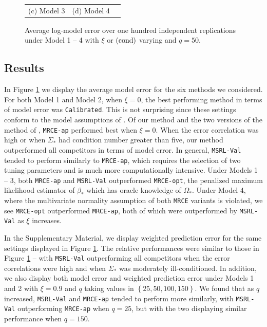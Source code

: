 \documentclass[12pt]{article}
\begin{document}
\begin{figure}[h!]
\begin{tabular}{ccc}
(c) Model 3  & (d) Model 4 & \\[6pt]
\end{tabular}
\caption{Average log-model error over one hundred independent replications under Model 1 -- 4 with $\xi$ or $(\rm cond)$ varying and $q=50$.}\label{fig:rho_Results}
\end{figure}

\subsection{Results}\label{subsec:Results}
In Figure \ref{fig:rho_Results} we display the average model error for the six methods we considered. For both Model 1 and Model 2, when $\xi = 0$, the best performing method in terms of model error was \texttt{Calibrated}. This is not surprising since these settings conform to the model assumptions of \citet{liu2015calibrated}. Of our method and the two versions of the method of \citet{rothman2010sparse}, \texttt{MRCE-ap} performed best when $\xi=0$. When the error correlation was high or when $\Sigma_*$ had condition number greater than five, our method outperformed all competitors in terms of model error. In general, \texttt{MSRL-Val} tended to perform similarly to \texttt{MRCE-ap}, which requires the selection of two tuning parameters and is much more computationally intensive. Under Models 1 -- 3, both \texttt{MRCE-ap} and \texttt{MSRL-Val} outperformed \texttt{MRCE-opt}, the penalized maximum likelihood estimator of $\beta_*$ which has oracle knowledge of $\Omega_*$. Under Model 4, where the multivariate normality assumption of both \texttt{MRCE} variants is violated, we see \texttt{MRCE-opt} outperformed \texttt{MRCE-ap}, both of which were outperformed by \texttt{MSRL-Val} as $\xi$ increases. 


In the Supplementary Material, we display weighted prediction error for the same settings displayed in Figure \ref{fig:rho_Results}. The relative performances were similar to those in Figure \ref{fig:rho_Results} -- with \texttt{MSRL-Val} outperforming all competitors when the error correlations were high and when $\Sigma_*$ was moderately ill-conditioned. In addition, we also display both model error and weighted prediction error under Models 1 and 2 with $\xi = 0.9$ and $q$ taking values in $\left\{25, 50, 100, 150\right\}$. We found that as $q$ increased, \texttt{MSRL-Val} and \texttt{MRCE-ap} tended to perform more similarly, with \texttt{MSRL-Val} outperforming \texttt{MRCE-ap} when $q = 25$, but with the two displaying similar performance when $q = 150$.
\end{document}

